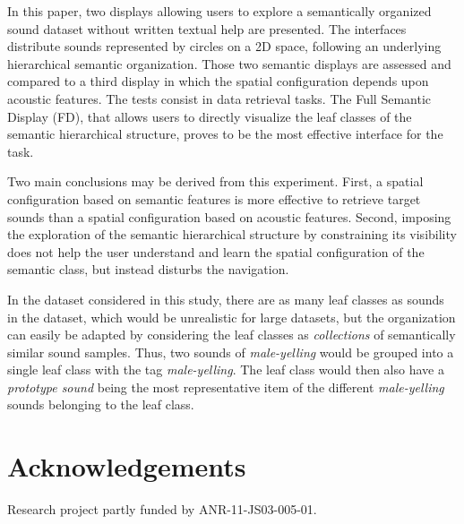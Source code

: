 \documentclass{aes2e}
\begin{document}
In this paper, two displays allowing users to explore a semantically organized sound dataset without written textual help are presented. The interfaces distribute sounds represented by circles on a 2D space, following an underlying hierarchical semantic organization. Those two semantic displays are assessed and compared to a third display in which the spatial configuration depends upon acoustic features. The tests consist in data retrieval tasks. 
The Full Semantic Display (FD), that allows users to directly visualize the leaf classes of the semantic hierarchical structure, proves to be the most effective interface for the task.

Two main conclusions may be derived from this experiment. First, a spatial configuration based on semantic features is more effective to retrieve target sounds than a spatial configuration based on acoustic features. Second, imposing the exploration of the semantic hierarchical structure by constraining its visibility does not help the user understand and learn the spatial configuration of the semantic class, but instead disturbs the navigation. 

In the dataset considered in this study, there are as many leaf classes as sounds in the dataset, which would be unrealistic for large datasets, but the organization can easily be adapted by considering the leaf classes as \textit{collections} of semantically similar sound samples. Thus, two sounds of \textit{male-yelling} would be grouped into a single leaf class with the tag \textit{male-yelling}. The leaf class would then also have a \textit{prototype sound} being the most representative item of the different \textit{male-yelling} sounds belonging to the leaf class.

%


\section{Acknowledgements}

Research project partly funded by ANR-11-JS03-005-01.


\end{document}
